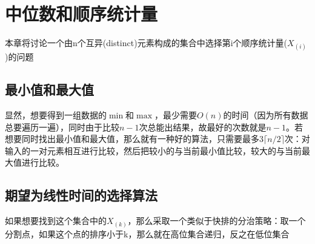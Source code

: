 \documentclass[]{report}
\begin{document}
	\chapter{中位数和顺序统计量}
		本章将讨论一个由n个互异(distinct)元素构成的集合中选择第i个顺序统计量($X_{(i)}$)的问题
	\section{最小值和最大值}
		显然，想要得到一组数据的$\min$和$\max$，最少需要$O(n)$的时间（因为所有数据总要遍历一遍），同时由于比较$n-1$次总能出结果，故最好的次数就是$n-1$。若想要同时找出最小值和最大值，那么就有一种好的算法，只需要最多$3\lceil n/2\rceil$次：对输入的一对元素相互进行比较，然后把较小的与当前最小值比较，较大的与当前最大值进行比较。
	\section{期望为线性时间的选择算法}
		如果想要找到这个集合中的$X_{(k)}$，那么采取一个类似于快排的分治策略：取一个分割点，如果这个点的排序小于k，那么就在高位集合递归，反之在低位集合
\end{document}
